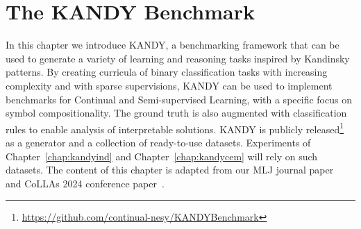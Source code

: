 \chapter{The KANDY Benchmark}
\label{chap:kandybench}

In this chapter we introduce \textsc{KANDY}, a benchmarking framework that can be used to generate a variety of learning and reasoning tasks inspired by Kandinsky patterns. By creating curricula of binary classification tasks with increasing complexity and with sparse supervisions, \textsc{KANDY} can be used to implement benchmarks for Continual and Semi-supervised Learning, with a specific focus on symbol compositionality. The ground truth is also augmented with classification rules to enable analysis of interpretable solutions.
\textsc{KANDY} is publicly released\footnote{\url{https://github.com/continual-nesy/KANDYBenchmark}} as a generator and a collection of ready-to-use datasets.
Experiments of Chapter~\ref{chap:kandyind} and Chapter~\ref{chap:kandycem} will rely on such datasets.
The content of this chapter is adapted from our MLJ journal paper~\cite{lorello2025kandy} and CoLLAs 2024 conference paper~\cite{lorello2024continual}.


